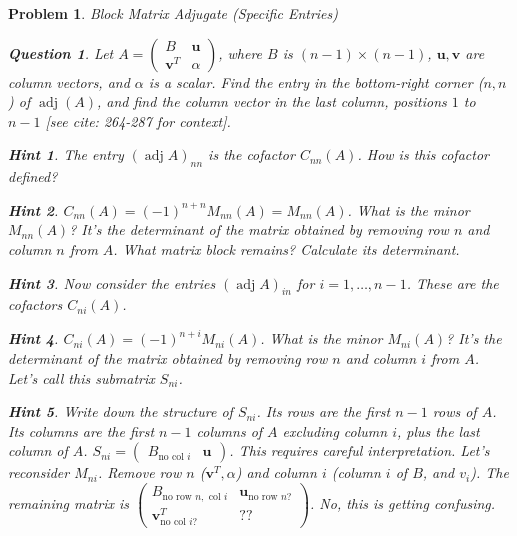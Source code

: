 \documentclass[12pt]{article}
\newtheorem{problem}{Problem}[section]
\newtheorem{question}{Question}[problem]
\theoremstyle{definition}
\newtheorem{hint}{Hint}[question]
\newcommand{\adj}{\operatorname{adj}}
\newcommand{\vect}[1]{\mathbf{#1}} %
\begin{document}
\begin{problem}{Block Matrix Adjugate (Specific Entries)}
    \begin{question}
        Let $A = \begin{pmatrix} B & \vect{u} \\ \vect{v}^T & \alpha \end{pmatrix}$, where $B$ is $(n-1) \times (n-1)$, $\vect{u}, \vect{v}$ are column vectors, and $\alpha$ is a scalar. Find the entry in the bottom-right corner ($n,n$) of $\adj(A)$, and find the column vector in the last column, positions $1$ to $n-1$ [see cite: 264-287 for context].
    \end{question}
    \begin{hint}
        The entry $(\adj A)_{nn}$ is the cofactor $C_{nn}(A)$. How is this cofactor defined?
    \end{hint}
    \begin{hint}
        $C_{nn}(A) = (-1)^{n+n} M_{nn}(A) = M_{nn}(A)$. What is the minor $M_{nn}(A)$? It's the determinant of the matrix obtained by removing row $n$ and column $n$ from $A$. What matrix block remains? Calculate its determinant.
    \end{hint}
    \begin{hint}
        Now consider the entries $(\adj A)_{in}$ for $i = 1, \dots, n-1$. These are the cofactors $C_{ni}(A)$.
    \end{hint}
    \begin{hint}
        $C_{ni}(A) = (-1)^{n+i} M_{ni}(A)$. What is the minor $M_{ni}(A)$? It's the determinant of the matrix obtained by removing row $n$ and column $i$ from $A$. Let's call this submatrix $S_{ni}$.
    \end{hint}
    \begin{hint}
        Write down the structure of $S_{ni}$. Its rows are the first $n-1$ rows of $A$. Its columns are the first $n-1$ columns of $A$ excluding column $i$, plus the last column of $A$.
        $S_{ni} = \begin{pmatrix} B_{\text{no col } i} & \vect{u} \end{pmatrix}$. This requires careful interpretation.
        Let's reconsider $M_{ni}$. Remove row $n$ ($\vect{v}^T, \alpha$) and column $i$ (column $i$ of $B$, and $v_i$).
        The remaining matrix is $\begin{pmatrix} B_{\text{no row } n, \text{ col } i} & \vect{u}_{\text{no row } n?} \\ \vect{v}^T_{\text{no col } i?} & ?? \end{pmatrix}$. No, this is getting confusing.

\end{hint}
\end{problem}
\end{document}
